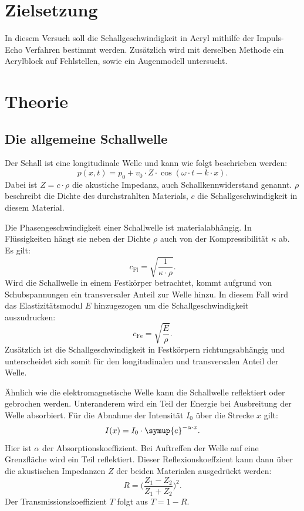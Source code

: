 \section{Zielsetzung}
\label{sec:Zielsetzung}
In diesem Versuch soll die Schallgeschwindigkeit in Acryl mithilfe der Impuls-Echo Verfahren bestimmt werden.
Zusätzlich wird mit derselben Methode ein Acrylblock auf Fehlstellen, sowie ein Augenmodell untersucht.

\section{Theorie}
\label{sec:Theorie}

\subsection{Die allgemeine Schallwelle}
\label{Schallwelle}

Der Schall ist eine longitudinale Welle und kann wie folgt beschrieben werden:
\begin{equation*}
    p(x, t) = p_0 + v_0 \cdot Z \cdot \cos(\omega \cdot t - k \cdot x).
\end{equation*}
Dabei ist $Z = c \cdot \rho$ die akustiche Impedanz, auch Schallkennwiderstand genannt.
$\rho$ beschreibt die Dichte des durchstrahlten Materials, $c$ die Schallgeschwindigkeit in diesem Material.

\noindent
Die Phasengeschwindigkeit einer Schallwelle ist materialabhängig.
In Flüssigkeiten hängt sie neben der Dichte $\rho$ auch von der Kompressibilität $\kappa$ ab.
Es gilt:
\begin{equation*}
    c_\text{Fl} = \sqrt{\frac{1}{\kappa \cdot \rho}}.
\end{equation*}
Wird die Schallwelle in einem Festkörper betrachtet, kommt aufgrund von Schubspannungen ein transversaler Anteil zur Welle hinzu.
In diesem Fall wird das Elastizitätsmodul $E$ hinzugezogen um die Schallgeschwindigkeit auszudrucken:
\begin{equation*}
    c_\text{Fe} = \sqrt{\frac{E}{\rho}}.
\end{equation*}
Zusätzlich ist die Schallgeschwindigkeit in Festkörpern richtungsabhängig und unterscheidet sich somit für den longitudinalen
und transversalen Anteil der Welle.

\noindent
Ähnlich wie die elektromagnetische Welle kann die Schallwelle reflektiert oder gebrochen werden.
Unteranderem wird ein Teil der Energie bei Ausbreitung der Welle absorbiert.
Für die Abnahme der Intensität $I_0$ über die Strecke $x$ gilt:
\begin{equation*}
    I(x) = I_0 \cdot \symup{e}^{-\alpha \cdot x}.
\end{equation*}
Hier ist $\alpha$ der Absorptionskoeffizient.
Bei Auftreffen der Welle auf eine Grenzfläche wird ein Teil reflektiert.
Dieser Reflexionskoeffzient kann dann über die akustischen Impedanzen $Z$ der beiden Materialen ausgedrückt werden:
\begin{equation*}
    R = \biggl(\frac{Z_1 - Z_2}{Z_1 + Z_2}\biggr)^2.
\end{equation*}
Der Transmissionskoeffizient $T$ folgt aus $T = 1 - R$.

